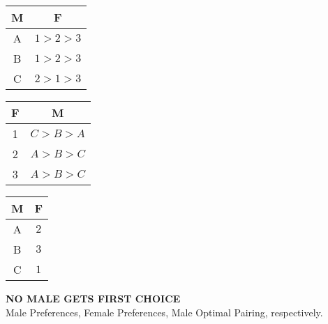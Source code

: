 \documentclass[a4paper]{article}
\begin{document}
\begin{table}[htbp]
    \begin{tabular}[t]{|c|c|}
        \hline
        M & F\\ \hline
        A & $1 > 2 > 3$\\ \hline
        B & $1 > 2 > 3$\\ \hline
        C & $2 > 1 > 3$\\ \hline
    \end{tabular}
    \hfill
    \begin{tabular}[t]{|c|c|}
        \hline
        F & M\\ \hline
        1 & $C > B > A$ \\ \hline
        2 & $A > B > C$\\ \hline  
        3 & $A > B > C$\\ \hline 
    \end{tabular}
    \hfill
    \begin{tabular}[t]{|c|c|}
        \hline
        M & F\\ \hline
        A & $2$\\ \hline
        B & $3$\\ \hline  
        C & $1$\\ \hline 
    \end{tabular}
    \hfill
\end{table}
\begin{center}
\scriptsize{\textbf{NO MALE GETS FIRST CHOICE}}\\
\scriptsize{Male Preferences, Female Preferences, Male Optimal Pairing, respectively.}
\end{center}
\end{document}
